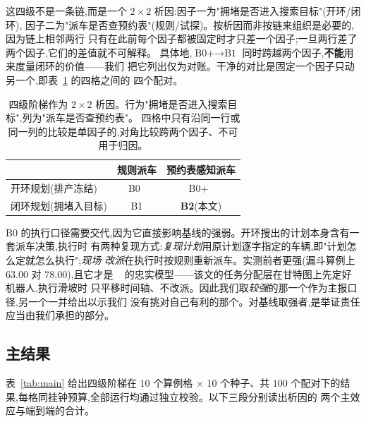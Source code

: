 \documentclass[manuscript,screen,review]{acmart}
\newcommand{\NCases}{10}
\newcommand{\NSeeds}{10}
\newcommand{\NPairs}{100}
\begin{document}
这四级不是一条链,而是一个 $2\times 2$ 析因:因子一为"拥堵是否进入搜索目标"(开环/闭环),
因子二为"派车是否查预约表"(规则/试探)。按析因而非按链来组织是必要的,因为链上相邻两行
只有在此前每个因子都被固定时才只差一个因子;一旦两行差了两个因子,它们的差值就不可解释。
具体地,$\text{B0+}\to\text{B1}$ 同时跨越两个因子,\textbf{不能}用来度量闭环的价值——我们
把它列出仅为对账。干净的对比是固定一个因子只动另一个,即表~\ref{tab:arms} 的四格之间的
四个配对。

\begin{table}[t]
\caption{四级阶梯作为 $2\times 2$ 析因。行为"拥堵是否进入搜索目标",列为"派车是否查预约表"。
四格中只有沿同一行或同一列的比较是单因子的,对角比较跨两个因子、不可用于归因。}
\label{tab:arms}
\footnotesize
\begin{tabular}{@{}lcc@{}}
\toprule
 & 规则派车 & 预约表感知派车 \\
\midrule
开环规划(排产冻结) & B0~\cite{li2026framework} & B0+~\cite{sun2023integrated} \\
闭环规划(拥堵入目标) & B1 & \textbf{B2}(本文) \\
\bottomrule
\end{tabular}
\end{table}

B0 的执行口径需要交代,因为它直接影响基线的强弱。开环搜出的计划本身含有一套派车决策,执行时
有两种复现方式:\emph{复现计划}用原计划逐字指定的车辆,即"计划怎么定就怎么执行";\emph{现场
改派}在执行时按规则重新派车。实测前者更强(漏斗算例上 $63.00$ 对 $78.00$),且它才是
~\cite{li2026framework} 的忠实模型——该文的任务分配层在甘特图上先定好机器人,执行滑坡时
只平移时间轴、不改派。因此我们取\emph{较强}的那一个作为主报口径,另一个一并给出以示我们
没有挑对自己有利的那个。对基线取强者,是举证责任应当由我们承担的部分。

\subsection{主结果}
\label{sec:main}

表~\ref{tab:main} 给出四级阶梯在 $\NCases$ 个算例格 $\times$ $\NSeeds$ 个种子、共
$\NPairs$ 个配对下的结果,每格同挂钟预算,全部运行均通过独立校验。以下三段分别读出析因的
两个主效应与端到端的合计。

\begin{table}[t]
\caption{四级阶梯在同挂钟预算下的完工时间,以及 $2\times 2$ 析因的四个单因子配对比较。
负值表示完工时间下降,即更好。$n=\NPairs$ 个按 $(\text{算例},\text{种子})$ 配对的比较,
双侧 Wilcoxon 符号秩检验。}
\label{tab:main}
\small

\end{table}
\end{document}
